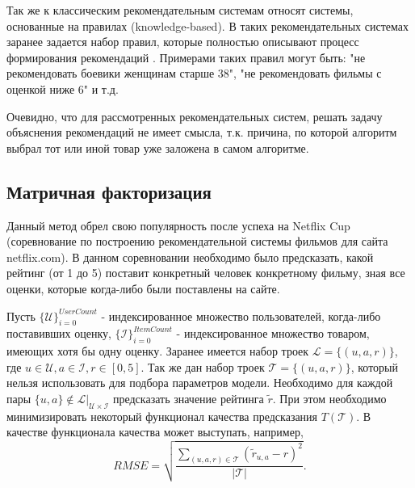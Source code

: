\documentclass[12pt,a4paper]{report}
\begin{document}
Так же к классическим рекомендательным системам относят системы, основанные на правилах (knowledge-based). В таких рекомендательных системах заранее задается набор правил, которые полностью описывают процесс формирования рекомендаций \cite{Know}.
 Примерами таких правил могут быть: "не рекомендовать боевики женщинам старше 38", "не рекомендовать фильмы с оценкой ниже 6" и т.д. 

Очевидно, что для рассмотренных рекомендательных систем, решать задачу объяснения рекомендаций не имеет смысла, т.к. причина, по которой алгоритм выбрал тот или иной товар уже заложена в самом алгоритме.
\subsection{Матричная факторизация}
Данный метод обрел свою популярность после успеха на Netflix Cup (соревнование по построению рекомендательной системы фильмов для сайта netflix.com). В данном соревновании необходимо было предсказать, какой рейтинг (от 1 до 5) поставит конкретный человек конкретному фильму, зная все оценки, которые когда-либо были поставлены на сайте.

Пусть $\{\mathcal{U}\}_{i=0}^{UserCount}$  - индексированное множество пользователей, когда-либо поставивших оценку, $\{\mathcal{I}\}_{i=0}^{ItemCount}$ - индексированное множество товаром, имеющих хотя бы одну оценку.
 Заранее имеется набор троек $\mathcal{L} = \{(u, a, r)\}$, где $u \in \mathcal{U}, a \in \mathcal{I}, r \in [0, 5]$. Так же дан набор троек $\mathcal{T} = \{(u, a, r)\}$, который нельзя использовать для подбора параметров модели. Необходимо для каждой пары $\{u,a\} \notin \mathcal{L|_{\mathcal{U}\times\mathcal{I}}}$ предсказать значение рейтинга $\tilde{r}$. При этом необходимо минимизировать некоторый функционал качества предсказания $T(\mathcal{T})$. В качестве функционала качества может выступать, например, 
\begin{equation*}
RMSE = \sqrt{\frac{\sum_{(u, a, r) \in \mathcal{T}}(\tilde{r}_{u,a} - r)^2}{|\mathcal{T}|}}.
\end{equation*}
\end{document}
